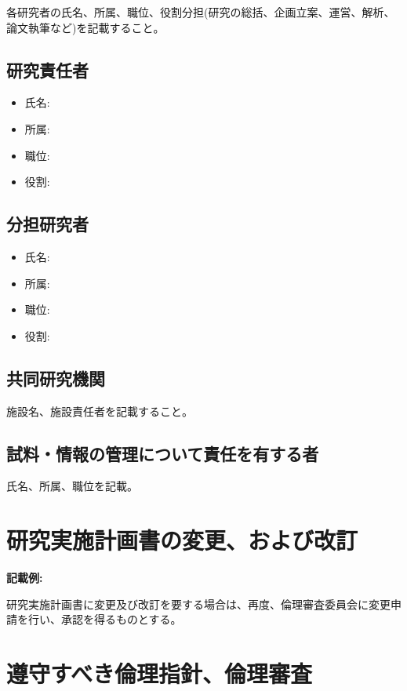 \documentclass{kyodai-protocol}
\begin{document}
各研究者の氏名、所属、職位、役割分担(研究の総括、企画立案、運営、解析、論文執筆など)を記載すること。

\subsection{研究責任者}

\begin{itemize}
\item 氏名:
\item 所属:
\item 職位:
\item 役割:
\end{itemize}

\subsection{分担研究者}

\begin{itemize}
\item 氏名:
\item 所属:
\item 職位:
\item 役割:
\end{itemize}

\subsection{共同研究機関}

施設名、施設責任者を記載すること。

\subsection{試料・情報の管理について責任を有する者}

氏名、所属、職位を記載。

\section{研究実施計画書の変更、および改訂}
\label{sec:amendments}

\textbf{記載例:}

研究実施計画書に変更及び改訂を要する場合は、再度、倫理審査委員会に変更申請を行い、承認を得るものとする。

\section{遵守すべき倫理指針、倫理審査}
\label{sec:ethics-compliance}
\end{document}
